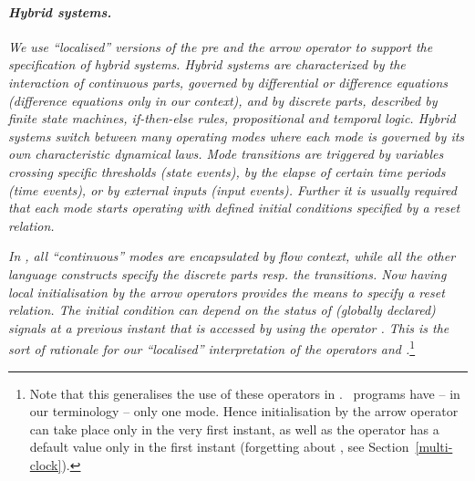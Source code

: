 \paragraph{\textit{Hybrid systems.}}\label{hybrid-system}
\emph{We use ``localised'' versions of the pre and the arrow operator to support
the specification of hybrid systems. Hybrid systems are characterized by the interaction of continuous parts, governed by differential or difference equations (difference equations only in our context), and by discrete parts, described by finite state machines, if-then-else rules, propositional and temporal logic. Hybrid systems switch between many operating modes where each mode is governed by its own characteristic dynamical laws. Mode transitions are triggered by variables crossing specific thresholds (state events), by the elapse of certain time periods (time events), or by external inputs (input events). Further it is usually required that each mode starts operating with defined initial conditions specified by a reset relation.
}

\emph{In \se, all ``continuous'' modes are encapsulated by flow context, while all
the other language constructs specify the discrete parts resp. the transitions. Now having local initialisation by the arrow operators provides
the means to specify a reset relation. The initial condition can depend 
on the status of (globally declared) signals at a previous instant that is accessed by using the operator . This is the sort of rationale for
our ``localised'' interpretation of the operators \pp{->} and .}\footnote{Note that this generalises the use of these operators in \lustre. \lustre\ programs have -- in our terminology -- only one mode. Hence initialisation by the arrow operator can take place only in the very first instant, as well as the operator  has a default value only in the first instant (forgetting about 
, see Section~\ref{multi-clock}).}


